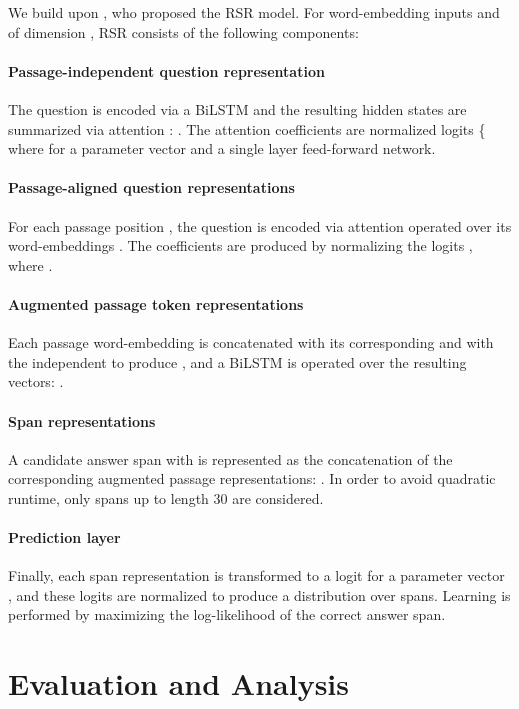 \documentclass[11pt,a4paper]{article}
\newcommand{\rasor}{\textsc{R\normalfont{a}S\normalfont{o}R}}
\begin{document}
We build upon \citet{lee2016}, who proposed the \rasor{} model. For word-embedding inputs  and  of dimension , \rasor{} consists of the following components:

\paragraph{Passage-independent question representation}
The question is encoded via a BiLSTM  and the resulting hidden states are summarized via attention \citep{bahdanau2014,DBLP:conf/emnlp/ParikhT0U16}: .
The attention coefficients  are normalized logits \{ where  for a parameter vector  and  a single layer feed-forward network.

\paragraph{Passage-aligned question representations}
For each passage position , the question is encoded via attention operated over its word-embeddings .
The coefficients  are produced by normalizing the logits , where .

\paragraph{Augmented passage token representations}
Each passage word-embedding  is concatenated with its corresponding  and with the independent  to produce , and a BiLSTM is operated over the resulting vectors: .

\paragraph{Span representations} A candidate answer span  with  is represented as the concatenation of the corresponding augmented passage representations: . In order to avoid quadratic runtime, only spans up to length 30 are considered.

\paragraph{Prediction layer}
Finally, each span representation  is transformed to a logit  for a parameter vector , and these logits are normalized to produce a distribution over spans. Learning is performed by maximizing the log-likelihood of the correct answer span.
 
\section{Evaluation and Analysis}
\label{sec:evaluation_and_analysis}
\end{document}
